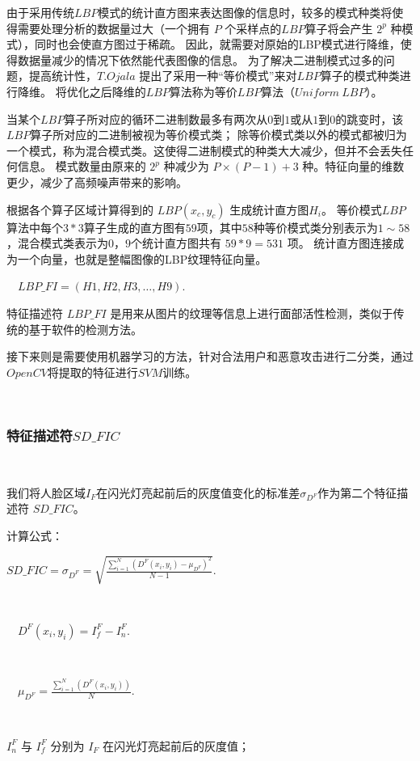 \documentclass[conference]{IEEEtran}
\begin{document}
由于采用传统$LBP$模式的统计直方图来表达图像的信息时，较多的模式种类将使得需要处理分析的数据量过大（一个拥有 $P$ 个采样点的$LBP$算子将会产生 $2^{p}$ 种模式），同时也会使直方图过于稀疏。
因此，就需要对原始的LBP模式进行降维，使得数据量减少的情况下依然能代表图像的信息。
为了解决二进制模式过多的问题，提高统计性，$T.Ojala$ 提出了采用一种“等价模式”来对$LBP$算子的模式种类进行降维。
将优化之后降维的$LBP$算法称为等价$LBP$算法（$Uniform \ LBP$）。

当某个$LBP$算子所对应的循环二进制数最多有两次从$0$到$1$或从$1$到$0$的跳变时，该$LBP$算子所对应的二进制被视为等价模式类；
除等价模式类以外的模式都被归为一个模式，称为混合模式类。这使得二进制模式的种类大大减少，但并不会丢失任何信息。
模式数量由原来的 $2^{p}$ 种减少为 $P\times (P-1)+3$ 种。特征向量的维数更少，减少了高频噪声带来的影响。

根据各个算子区域计算得到的 $LBP(x_c, y_c)$ 生成统计直方图$H_i$。
等价模式$LBP$算法中每个$3*3$算子生成的直方图有$59$项，其中$58$种等价模式类分别表示为$1\sim58$，混合模式类表示为$0$，$9$个统计直方图共有 $59*9=531$ 项。
统计直方图连接成为一个向量，也就是整幅图像的LBP纹理特征向量。

\ \ {$LBP \_ FI = (H1,H2,H3,\dots,H9).$}

特征描述符 $LBP \_ FI$ 是用来从图片的纹理等信息上进行面部活性检测，类似于传统的基于软件的检测方法。

接下来则是需要使用机器学习的方法，针对合法用户和恶意攻击进行二分类，通过$OpenCV$将提取的特征进行$SVM$训练。

\ 

\subsubsection{特征描述符$SD \_ FIC$}
\ 

我们将人脸区域$I_F$在闪光灯亮起前后的灰度值变化的标准差$\sigma_{D^{F}}$作为第二个特征描述符 $SD \_ FIC$。

计算公式：

{$SD \_ FIC = \sigma_{D^{F}} = \displaystyle\sqrt{\frac{\sum_{i=1}^{N}{(D^{F}(x_i,y_i)-\mu_{D^{F}})}^{2}}{N-1}}.$}

\ 

\ \ {$D^{F}(x_i,y_i) = I_f^{F} - I_n^{F}.$}

\ 

\ \ {$\mu_{D^{F}} = {\displaystyle\frac{\sum_{i=1}^{N}(D^{F}(x_i,y_i))}{N}}.$}

\ 

$I_n^{F}$ 与 $I_f^{F}$ 分别为 $I_F$ 在闪光灯亮起前后的灰度值；
\end{document}
